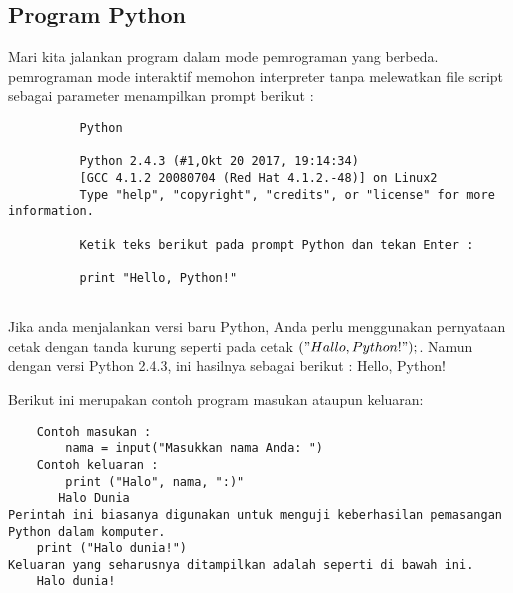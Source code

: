 \subsection{Program Python}
Mari kita jalankan program dalam mode pemrograman yang berbeda. pemrograman mode interaktif memohon interpreter tanpa melewatkan file script sebagai parameter menampilkan prompt berikut :
    \begin{verbatim}
          Python
          
          Python 2.4.3 (#1,Okt 20 2017, 19:14:34)
          [GCC 4.1.2 20080704 (Red Hat 4.1.2.-48)] on Linux2
          Type "help", "copyright", "credits", or "license" for more information.
          
          Ketik teks berikut pada prompt Python dan tekan Enter :
          
          print "Hello, Python!"
          
     \end{verbatim}
Jika anda menjalankan versi baru Python, Anda perlu menggunakan pernyataan cetak dengan tanda kurung seperti pada cetak $("Hallo, Python!");$. Namun dengan versi Python 2.4.3, ini hasilnya sebagai berikut :
Hello, Python!

Berikut ini merupakan contoh program masukan ataupun keluaran:
\begin{verbatim}
    Contoh masukan : 
        nama = input("Masukkan nama Anda: ")
    Contoh keluaran :
        print ("Halo", nama, ":)"
       Halo Dunia
Perintah ini biasanya digunakan untuk menguji keberhasilan pemasangan Python dalam komputer.
    print ("Halo dunia!")
Keluaran yang seharusnya ditampilkan adalah seperti di bawah ini.
    Halo dunia!
\end{verbatim}


